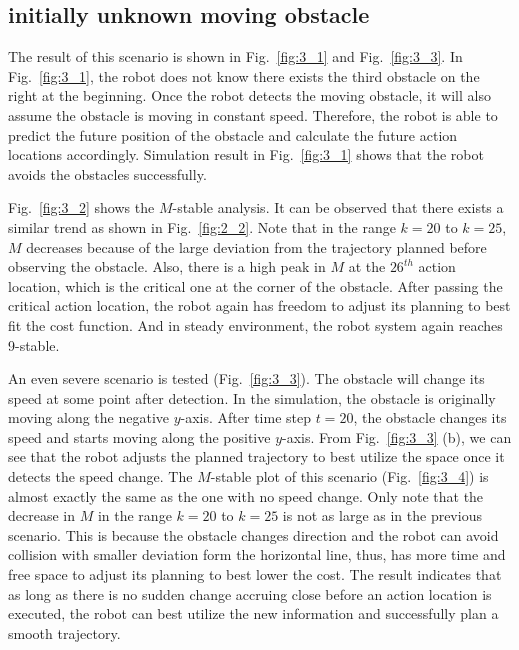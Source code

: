 \documentclass{ifacconf}
\begin{document}
\subsection{initially unknown moving obstacle}

The result of this scenario is shown in Fig.~\ref{fig:3_1} and Fig.~\ref{fig:3_3}. In Fig.~\ref{fig:3_1}, the robot does not know there exists the third obstacle on the right at the beginning. Once the robot detects the moving obstacle, it will also assume the obstacle is moving in constant speed. Therefore, the robot is able to predict the future position of the obstacle and calculate the future action locations accordingly. Simulation result in Fig.~\ref{fig:3_1} shows that the robot avoids the obstacles successfully.

Fig.~\ref{fig:3_2} shows the $M$-stable analysis. It can be observed that there exists a similar trend as shown in Fig.~\ref{fig:2_2}. Note that in the range $k=20$ to $k=25$, $M$ decreases because of the large deviation from the trajectory planned before observing the obstacle. Also, there is a high peak in $M$ at the $26^{th}$ action location, which is the critical one at the corner of the obstacle. After passing the critical action location, the robot again has freedom to adjust its planning to best fit the cost function. And in steady environment, the robot system again reaches 9-stable. 

An even severe scenario is tested (Fig.~\ref{fig:3_3}). The obstacle will change its speed at some point after detection. In the simulation, the obstacle is originally moving along the negative $y$-axis. After time step $t=20$, the obstacle changes its speed and starts moving along the positive $y$-axis. From Fig.~\ref{fig:3_3} (b), we can see that the robot adjusts the planned trajectory to best utilize the space once it detects the speed change. The $M$-stable plot of this scenario (Fig.~\ref{fig:3_4}) is almost exactly the same as the one with no speed change. Only note that the decrease in $M$ in the range $k=20$ to $k=25$ is not as large as in the previous scenario. This is because the obstacle changes direction and the robot can avoid collision with smaller deviation form the horizontal line, thus, has more time and free space to adjust its planning to best lower the cost. The result indicates that as long as there is no sudden change accruing close before an action location is executed, the robot can best utilize the new information and successfully plan a smooth trajectory.
\end{document}
